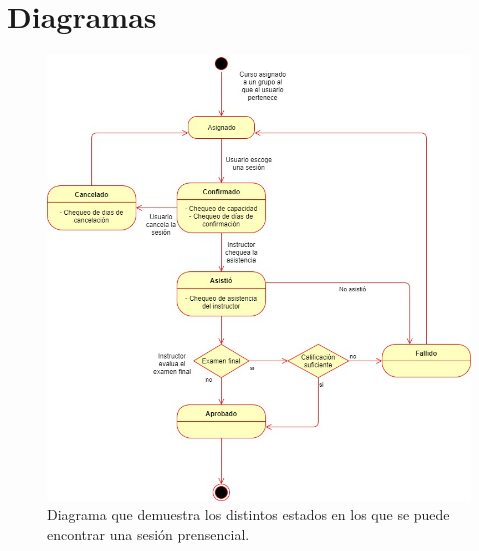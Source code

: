 
\chapter{Diagramas}

\begin{figure}[t]
	\begin{center}
		\includegraphics[width=\textwidth]{figuras/diagramaEstadosSesion.jpg}
		\caption{Diagrama que demuestra los distintos estados en los que se puede encontrar una sesión prensencial.} \label{fig:diagramaEstadosSesion}
	\end{center}
\end{figure}

